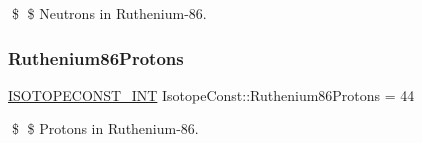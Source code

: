 \$ \$ Neutrons in Ruthenium-\/86. \mbox{\label{group___isotope_const-_ruthenium-_ru86_gaf19157829de4b9919724176d65a5befc}} 
\subsubsection{\texorpdfstring{Ruthenium86\+Protons}{Ruthenium86Protons}}
{\footnotesize\ttfamily \mbox{\hyperlink{group___isotope_const-_macros_ga5f18360b3e99483a35c32d789e62621c}{I\+S\+O\+T\+O\+P\+E\+C\+O\+N\+S\+T\+\_\+\+I\+NT}} Isotope\+Const\+::\+Ruthenium86\+Protons = 44}

\$ \$ Protons in Ruthenium-\/86. 